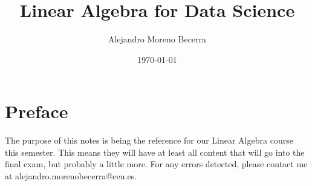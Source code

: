 \documentclass{hubbardbook}
\title{Linear Algebra for Data Science}
\author{Alejandro Moreno Becerra}
\date{\today}
\begin{document}
\frontmatter
\maketitle
\tableofcontents

\chapter*{Preface}
The purpose of this notes is being the reference for our Linear Algebra course this semester. This means they will have at least all content that will go into the final exam, but probably a little more. For any errors detected, please contact me at alejandro.morenobecerra@ceu.es.

\mainmatter

% 


\backmatter
\end{document}
